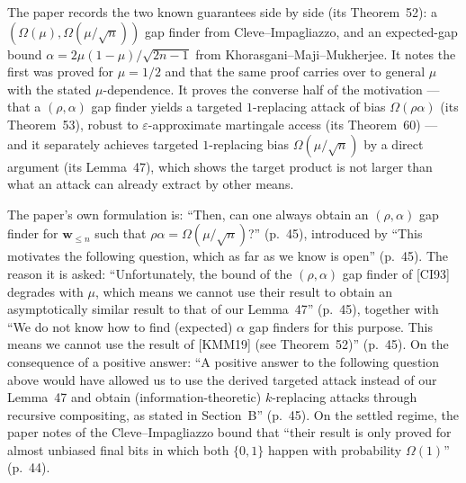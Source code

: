\documentclass{aicr-conjecture}
\newcommand{\wv}{\mathbf{w}}
\begin{document}
\begin{remark}\label{rem:progress}
The paper records the two known guarantees side by side (its
Theorem~52): a $(\Omega(\mu), \Omega(\mu/\sqrt{n}))$ gap finder from
Cleve--Impagliazzo, and an expected-gap bound
$\alpha = 2\mu(1-\mu)/\sqrt{2n-1}$ from Khorasgani--Maji--Mukherjee. It
notes the first was proved for $\mu = 1/2$ and that the same proof
carries over to general $\mu$ with the stated $\mu$-dependence. It
proves the converse half of the motivation --- that a $(\rho,\alpha)$
gap finder yields a targeted $1$-replacing attack of bias
$\Omega(\rho\alpha)$ (its Theorem~53), robust to
$\varepsilon$-approximate martingale access (its Theorem~60) --- and it
separately achieves targeted $1$-replacing bias $\Omega(\mu/\sqrt{n})$
by a direct argument (its Lemma~47), which shows the target product is
not larger than what an attack can already extract by other means.
\end{remark}

\begin{remark}[Openness]\label{rem:open}
The paper's own formulation is: ``Then, can one always obtain an
$(\rho, \alpha)$ gap finder for $\wv_{\le n}$ such that
$\rho\alpha = \Omega(\mu/\sqrt{n})$?'' (p.~45), introduced by ``This
motivates the following question, which as far as we know is open''
(p.~45). The reason it is asked: ``Unfortunately, the bound of the
$(\rho, \alpha)$ gap finder of [CI93] degrades with $\mu$, which means
we cannot use their result to obtain an asymptotically similar result to
that of our Lemma~47'' (p.~45), together with ``We do not know how to
find (expected) $\alpha$ gap finders for this purpose. This means we
cannot use the result of [KMM19] (see Theorem~52)'' (p.~45). On the
consequence of a positive answer: ``A positive answer to the following
question above would have allowed us to use the derived targeted attack
instead of our Lemma~47 and obtain (information-theoretic)
$k$-replacing attacks through recursive compositing, as stated in
Section~B'' (p.~45). On the settled regime, the paper notes of the
Cleve--Impagliazzo bound that ``their result is only proved for almost
unbiased final bits in which both $\{0, 1\}$ happen with probability
$\Omega(1)$'' (p.~44).
\end{remark}
\end{document}
